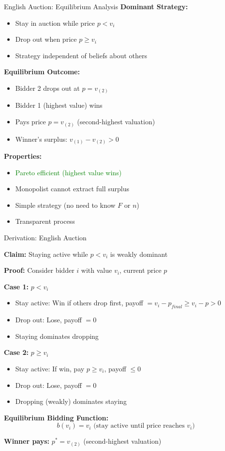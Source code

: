 \documentclass[xcolor={x11names}]{beamer}
\begin{document}
\begin{frame}{English Auction: Equilibrium Analysis}
\textbf{Dominant Strategy:}
\begin{itemize}
  \item Stay in auction while price $p < v_i$
  \item Drop out when price $p \geq v_i$
  \item Strategy independent of beliefs about others
\end{itemize}


\textbf{Equilibrium Outcome:}
\begin{itemize}
  \item Bidder 2 drops out at $p = v_{(2)}$
  \item Bidder 1 (highest value) wins
  \item Pays price $p = v_{(2)}$ (second-highest valuation)
  \item Winner's surplus: $v_{(1)} - v_{(2)} > 0$
\end{itemize}


\textbf{Properties:}
\begin{itemize}
  \item \textcolor{green}{Pareto efficient (highest value wins)}
  \item Monopolist cannot extract full surplus
  \item Simple strategy (no need to know $F$ or $n$)
  \item Transparent process
\end{itemize}
\end{frame}


\begin{frame}{Derivation: English Auction}

\textbf{Claim:} Staying active while $p < v_i$ is weakly dominant

\textbf{Proof:}
Consider bidder $i$ with value $v_i$, current price $p$

\textbf{Case 1:} $p < v_i$
\begin{itemize}
  \item Stay active: Win if others drop first, payoff $= v_i - p_{final} \geq v_i - p > 0$
  \item Drop out: Lose, payoff $= 0$
  \item Staying dominates dropping
\end{itemize}

\textbf{Case 2:} $p \geq v_i$
\begin{itemize}
  \item Stay active: If win, pay $p \geq v_i$, payoff $\leq 0$
  \item Drop out: Lose, payoff $= 0$
  \item Dropping (weakly) dominates staying
\end{itemize}

\textbf{Equilibrium Bidding Function:}
$$b(v_i) = v_i \text{ (stay active until price reaches } v_i\text{)}$$

\textbf{Winner pays:} $p^* = v_{(2)}$ (second-highest valuation)
\end{frame}
\end{document}
